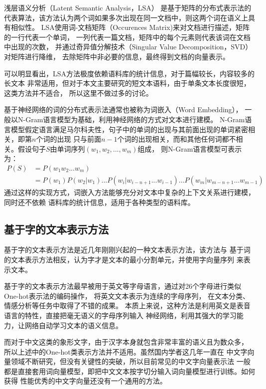 浅层语义分析（Latent Semantic Analysis，LSA）
是基于矩阵的分布式表示法的
代表算法，该方法认为两个词如果多次出现在同一文档中，则这两个词在语义上具有相似性。
LSA使用词-文档矩阵（Occurences Matrix)来对文档进行描述，矩阵的一行代表一个单词，
一列代表一篇文档，矩阵中的每个元素则代表该词在文档中出现的次数，
并通过奇异值分解技术（Singular Value Decomposition，SVD）对矩阵进行降维，
去除矩阵中非必要的信息，最终得到文档的向量表示。

可以明显看出，LSA方法极度依赖语料库的统计信息，对于篇幅较长，内容较多的长文本
非常适用，但对于本文主要研究的短文本语料，由于单条文本长度很短，这类方法并不适合，
所以这里不做过多的讨论。

基于神经网络的词的分布式表示法通常也被称为词嵌入（Word Embedding），
一般以N-Gram语言模型为基础，利用神经网络的方式对文本进行建模。
N-Gram语言模型假定语言满足马尔科夫性，句子中的单词的出现与其前面出现的单词紧密相关，即第$n$个词的出现
只与前面$n-1$个词的出现相关，而和其他任何词都不相关。假设句子$S$由单词序列$\left (w_1,w_2,...,w_m  \right )$组成，
则N-Gram语言模型可表示为：
\begin{equation}
    \begin{aligned}
        P\left ( S \right )&=P\left ( w_1w_2...w_m \right )\\
        &=P\left ( w_1 \right )P\left ( w_2|w_1 \right )...
P\left ( w_i|w_{i-n+1}...w_{i-1} \right )...P\left ( w_m|w_{m-n+1}...w_{m-1} \right )
    \end{aligned}
    \label{n-gram}
\end{equation}
通过这样的实现方式，词嵌入方法能够充分对文本中复杂的上下文关系进行建模，同时还不依赖
语料库的统计信息，适用于各种类型的语料库。

\subsection{基于字的文本表示方法}
基于字的文本表示方法是近几年刚刚兴起的一种文本表示方法，该方法与
基于词的文本表示方法相反，认为字才是文本的最小分割单元，并使用字向量序列
来表示文本。

基于字的文本表示方法最早被用于英文等字母语言，通过对26个字母进行类似One-hot表示法的编码操作，
将英文文本表示为连续的字母序列，
在文本分类、情感分析等任务中取得了不错的成果。
本质上来说，这种方法是利用英文是表音语言的特性，直接把毫无语义的字母序列输入
神经网络，利用其强大的学习能力，让网络自动学习文本的语义信息。

而对于中文这类的象形文字，由于汉字本身就包含非常丰富的语义且为数众多，
所以上述中的One-hot类表示方法并不适用。虽然国内学者这几年一直在
中文字向量领域不断研究，但没有关键性的突破，所以目前常见的中文字向量表示法
一般都是直接套用词向量模型，即把中文文本按字切分输入词向量模型进行训练。如何获得
性能优秀的中文字向量还没有一个通用的方法。

